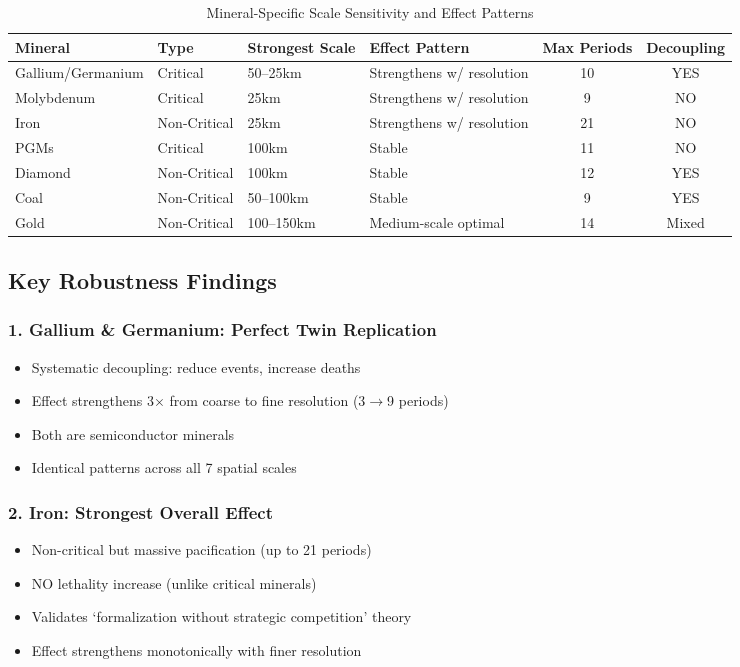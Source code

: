\documentclass[11pt]{article}
\begin{document}
\begin{table}[H]
\centering
\caption{Mineral-Specific Scale Sensitivity and Effect Patterns}
\begin{tabular}{p{3cm}p{2.5cm}p{2.5cm}p{3cm}cc}
\toprule
Mineral & Type & Strongest Scale & Effect Pattern & Max Periods & Decoupling \\
\midrule
Gallium/Germanium & Critical & 50--25km & Strengthens w/ resolution & 10 & YES \\
Molybdenum & Critical & 25km & Strengthens w/ resolution & 9 & NO \\
Iron & Non-Critical & 25km & Strengthens w/ resolution & 21 & NO \\
PGMs & Critical & 100km & Stable & 11 & NO \\
Diamond & Non-Critical & 100km & Stable & 12 & YES \\
Coal & Non-Critical & 50--100km & Stable & 9 & YES \\
Gold & Non-Critical & 100--150km & Medium-scale optimal & 14 & Mixed \\
\bottomrule
\end{tabular}
\end{table}

\subsection{Key Robustness Findings}

\subsubsection{1. Gallium \& Germanium: Perfect Twin Replication}
\begin{itemize}
\item Systematic decoupling: reduce events, increase deaths
\item Effect strengthens 3$\times$ from coarse to fine resolution (3$\rightarrow$9 periods)
\item Both are semiconductor minerals
\item Identical patterns across all 7 spatial scales
\end{itemize}

\subsubsection{2. Iron: Strongest Overall Effect}
\begin{itemize}
\item Non-critical but massive pacification (up to 21 periods)
\item NO lethality increase (unlike critical minerals)
\item Validates `formalization without strategic competition' theory
\item Effect strengthens monotonically with finer resolution
\end{itemize}
\end{document}
